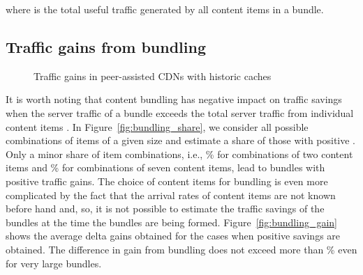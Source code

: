 \documentclass[10pt, conference, letterpaper]{IEEEtran}
\begin{document}
   

where  is the total useful traffic generated by all content items in a bundle. 














\subsection{Traffic gains from bundling}


  \begin{figure*}
     \centering
			\hspace{1em}
			\hspace{1em}
			\hspace{1em}
\caption{Traffic gains in peer-assisted CDNs with historic caches}\vspace{-4mm}
  \end{figure*}


It is worth noting that content bundling has negative impact on traffic savings when the server traffic of a bundle  exceeds the total server traffic from individual content items . In Figure~\ref{fig:bundling_share}, we consider all possible combinations of items of a given size and estimate a share of those with positive . Only a minor share of item combinations, i.e., \% for combinations of two content items and \% for combinations of seven content items, lead to bundles with positive traffic gains. The choice of content items for bundling is even more complicated by the fact that the arrival rates  of content items are not known before hand and, so, it is not possible to estimate the traffic savings  of the bundles at the time the bundles are being formed. Figure~\ref{fig:bundling_gain} shows the average delta gains obtained for the cases when positive savings are obtained. The difference in gain from bundling does not exceed more than \% even for very large bundles. 
\end{document}
